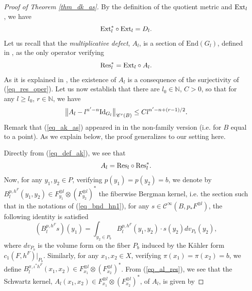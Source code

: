 \documentclass[12pt]{article}
\numberwithin{equation}{section}
\theoremstyle{theorem}
\theoremstyle{definition}
\theoremstyle{remark}
\newcommand{\res}{{\rm{Res}}}
\newcommand{\ext}{{\rm{Ext}}}
\newcommand{\nat}{\mathbb{N}}
\newcommand{\enmr}[1]{\text{End}{(#1)}}
\newcommand{\ccal}{\mathscr{C}}
\begin{document}
	\begin{proof}[Proof of Theorem \ref{thm_dk_as}]
		By the definition of the quotient metric and $\ext_l$, we have
		\begin{equation}\label{eq_ext_dk}
			\ext_l^* \circ \ext_l = D_l.
		\end{equation}
		Let us recall that the \textit{multiplicative defect}, $A_l$, is a section of  $\enmr{G_l}$, defined in \cite[Theorem 4.3]{FinToeplImm}, as the only operator verifying
		\begin{equation}\label{eq_def_ak}
			\res_l^* = \ext_l \circ A_l.
		\end{equation}
		As it is explained in \cite[Theorem 4.3]{FinToeplImm}, the existence of $A_l$ is a consequence of the surjectivity of (\ref{eq_res_oper}).
		Let us now establish that there are $l_0 \in \nat$, $C > 0$, so that for any $l \geq l_0$, $r \in \nat$, we have
		\begin{equation}\label{eq_ak_as}
			\big\| 
				A_l
				-
				l^{n' - n} {\rm{Id}}_{G_l}
			\big\|_{\ccal^r(B)}
			\leq 
			C l^{n' - n + (r - 1)/2}.
		\end{equation}
		Remark that (\ref{eq_ak_as}) appeared in \cite[Theorem 4.3]{FinToeplImm} in the non-family version (i.e. for $B$ equal to a point). As we explain below, the proof generalizes to our setting here.
		\par 
		Directly from (\ref{eq_def_ak}), we see that 
		\begin{equation}\label{eq_al_res}
			A_l = \res_l \circ \res_l^*.
		\end{equation}
		Now, for any $y_1, y_2 \in P$, verifying $p(y_1) = p(y_2) = b$, we denote by $B_l^{p, h^F}(y_1, y_2) \in F_{y_1}^{\otimes l} \otimes (F_{y_2}^{\otimes l})^*$ the fiberwise Bergman kernel, i.e. the section such that in the notations of (\ref{eq_bnd_hn1}), for any $s \in \ccal^{\infty}(B, p_* F^{\otimes l})$, the following identity is satisfied
		\begin{equation}
			(B_l^{p, h^F} s) (y_1) 
			=
			\int_{y_2 \in P_b}
			B_l^{p, h^F}(y_1, y_2) \cdot s(y_2) dv_{P_b}(y_2),
		\end{equation}
		where $dv_{P_b}$ is the volume form on the fiber $P_b$ induced by the Kähler form $c_1(F, h^F)|_{P_b}$.
		Similarly, for any $x_1, x_2 \in X$, verifying $\pi(x_1) = \pi(x_2) = b$, we define $B_l^{\pi, \iota^* h^F}(x_1, x_2) \in F_{x_1}^{\otimes l} \otimes (F_{x_2}^{\otimes l})^*$.
		From (\ref{eq_al_res}), we see that the Schwartz kernel, $A_l(x_1, x_2) \in F_{x_1}^{\otimes l} \otimes (F_{x_2}^{\otimes l})^*$, of $A_l$, is given by

\end{proof}
\end{document}

